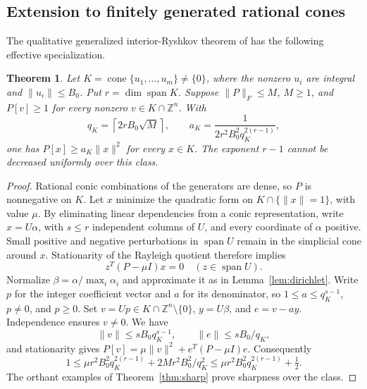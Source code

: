 \documentclass[11pt]{article}
\newtheorem{theorem}{Theorem}[section]
\theoremstyle{remark}\newtheorem{remark}[theorem]{Remark}
\newcommand{\cone}{\operatorname{cone}}
\newcommand{\norm}[1]{\lVert#1\rVert}
\begin{document}
\subsection{Extension to finitely generated rational cones}
The qualitative generalized interior-Ryshkov theorem of \cite{OS26} has the following effective specialization.
\begin{theorem}\label{thm:generalcone}
Let $K=\cone\{u_1,\ldots,u_m\}\ne\{0\}$, where the nonzero $u_i$ are integral and $\norm{u_i}\le B_0$. Put $r=\dim\operatorname{span}K$. Suppose $\norm P_F\le M$, $M\ge1$, and $P[v]\ge1$ for every nonzero $v\in K\cap\mathbb Z^n$. With
\[
 q_K=\left\lceil2rB_0\sqrt M\right\rceil,\qquad
a_K=\frac1{2r^2B_0^2 q_K^{2(r-1)}},
\]
one has $P[x]\ge a_K\norm x^2$ for every $x\in K$.
The exponent $r-1$ cannot be decreased uniformly over this class.
\end{theorem}
\begin{proof}
Rational conic combinations of the generators are dense, so $P$ is nonnegative on $K$. Let $x$ minimize the quadratic form on $K\cap\{\norm x=1\}$, with value $\mu$. By eliminating linear dependencies from a conic representation, write $x=U\alpha$, with $s\le r$ independent columns of $U$, and every coordinate of $\alpha$ positive. Small positive and negative perturbations in $\operatorname{span}U$ remain in the simplicial cone around $x$. Stationarity of the Rayleigh quotient therefore implies
\[
 z^T(P-\mu I)x=0\quad(z\in\operatorname{span}U).
\]
Normalize $\beta=\alpha/\max_i\alpha_i$ and approximate it as in Lemma~\ref{lem:dirichlet}. Write $p$ for the integer coefficient vector and $a$ for its denominator, so $1\le a\le q_K^{s-1}$, $p\ne0$, and $p\ge0$. Set $v=Up\in K\cap\mathbb Z^n\setminus\{0\}$, $y=U\beta$, and $e=v-a y$. Independence ensures $v\ne0$. We have
\[
 \norm v\le sB_0q_K^{s-1},\qquad \norm e\le sB_0/q_K,
\]
and stationarity gives $P[v]=\mu\norm v^2+e^T(P-\mu I)e$. Consequently
\[
 1\le\mu r^2B_0^2q_K^{2(r-1)}+2M r^2B_0^2/q_K^2
 \le\mu r^2B_0^2q_K^{2(r-1)}+\tfrac12.
\]
The orthant examples of Theorem~\ref{thm:sharp} prove sharpness over the class.
\end{proof}
\end{document}
